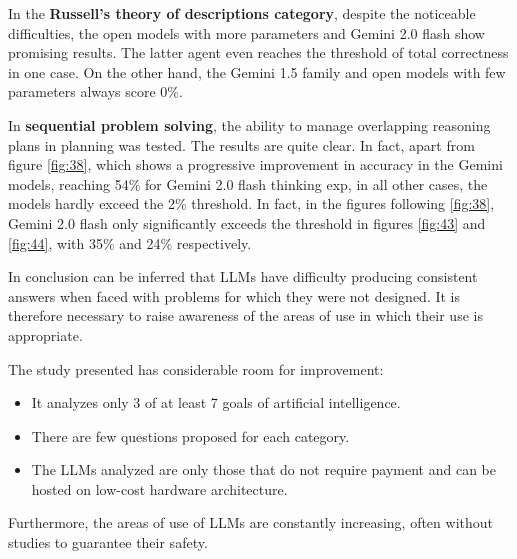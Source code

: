 \documentclass[12pt]{article}
\begin{document}
In the \textbf{Russell's theory of descriptions category}, despite the noticeable difficulties, the open models with more parameters and Gemini 2.0 flash show promising results. The latter agent even reaches the threshold of total correctness in one case. On the other hand, the Gemini 1.5 family and open models with few parameters always score 0\%.

In \textbf{sequential problem solving}, the ability to manage overlapping reasoning plans in planning was tested. The results are quite clear. In fact, apart from figure \ref{fig:38}, which shows a progressive improvement in accuracy in the Gemini models, reaching 54\% for Gemini 2.0 flash thinking exp, in all other cases, the models hardly exceed the 2\% threshold.
In fact, in the figures following \ref{fig:38}, Gemini 2.0 flash only significantly exceeds the threshold in figures \ref{fig:43} and \ref{fig:44}, with 35\% and 24\% respectively.

In conclusion can be inferred that LLMs have difficulty producing consistent answers when faced with problems for which they were not designed.
It is therefore necessary to raise awareness of the areas of use in which their use is appropriate.

The study presented has considerable room for improvement: 
\begin{itemize}
\item It analyzes only 3 of at least 7 goals of artificial intelligence.
\item There are few questions proposed for each category.
\item The LLMs analyzed are only those that do not require payment and can be hosted on low-cost hardware architecture.
\end{itemize}
Furthermore, the areas of use of LLMs are constantly increasing, often without studies to guarantee their safety.

\clearpage
\printbibliography
\clearpage
\end{document}
